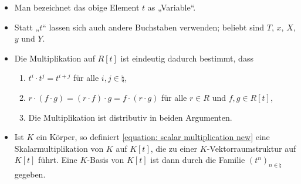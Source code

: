 \begin{remark*}
  \begin{itemize}
    \item
      Man bezeichnet das obige Element $t$ as „Variable“.
    \item
      Statt „$t$“ lassen sich auch andere Buchstaben verwenden;
      beliebt sind $T$, $x$, $X$, $y$ und $Y$.
    \item
      Die Multiplikation auf $R[t]$ ist eindeutig dadurch bestimmt, dass
      \begin{enumerate}
        \item
          $t^i \cdot t^j = t^{i+j}$ für alle $i,j \in \natural$,
        \item
          $r \cdot (f \cdot g) = (r \cdot f) \cdot g = f \cdot (r \cdot g)$ für alle $r \in R$ und $f,g \in R[t]$,
        \item
          Die Multiplikation ist distributiv in beiden Argumenten.
      \end{enumerate}
    \item
      Ist $K$ ein Körper, so definiert \eqref{equation: scalar multiplication new} eine Skalarmultiplikation von $K$ auf $K[t]$, die zu einer $K$-Vektorraumstruktur auf $K[t]$ führt.
      Eine $K$-Basis von $K[t]$ ist dann durch die Familie $(t^n)_{n \in \natural}$ gegeben.
  \end{itemize}
\end{remark*}
